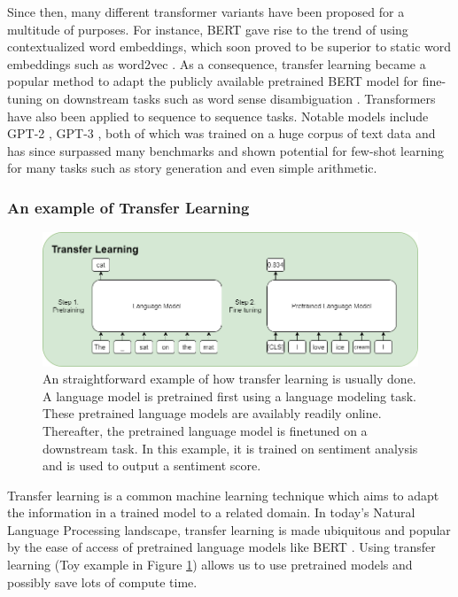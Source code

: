 Since then, many different transformer variants \cite{wolf-etal-2020-transformers} have been proposed for a multitude of purposes. For instance, BERT \cite{devlin_bert_2019} gave rise to the trend of using contextualized word embeddings, which soon proved to be superior to static word embeddings such as word2vec \cite{mikolov_efficient_2013_word2vec}. As a consequence, transfer learning became a popular method to adapt the publicly available pretrained BERT model for fine-tuning on downstream tasks such as word sense disambiguation \cite{yap_adapting_2020}. Transformers have also been applied to sequence to sequence tasks. Notable models include GPT-2 \cite{radford_language_nodate_gpt2}, GPT-3 \cite{brown_language_2020_gpt3}, both of which was trained on a huge corpus of text data and has since surpassed many benchmarks and shown potential for few-shot learning for many tasks such as story generation and even simple arithmetic.

\subsubsection{An example of Transfer Learning}\label{subsubsec:transfer_learning_me}

\label{subsec:transfer_learning}
\begin{figure}[hpbt!]
    \centering
    \includegraphics[scale=0.5]{images/chap02_images/transfer_learning_toy_example.png}
    \caption{An straightforward example of how transfer learning is usually done. A language model is pretrained first using a language modeling task. These pretrained language models are availably readily online. Thereafter, the pretrained language model is finetuned on a downstream task. In this example, it is trained on sentiment analysis and is used to output a sentiment score.}
    \label{fig:transfer_learning_toy_example}
\end{figure}
Transfer learning \cite{zhuang_comprehensive_2020_transfer_learning} is a common machine learning technique which aims to adapt the information in a trained model to a related domain. In today's Natural Language Processing landscape, transfer learning is made ubiquitous and popular by the ease of access of pretrained language models like BERT \cite{devlin_bert_2019}. Using transfer learning (Toy example in Figure \ref{fig:transfer_learning_toy_example}) allows us to use pretrained models and possibly save lots of compute time.

